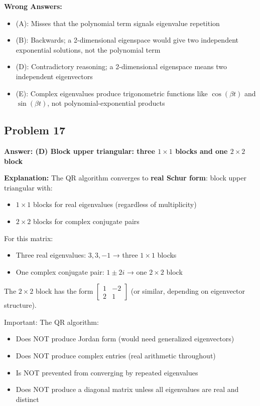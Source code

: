 \documentclass[12pt]{amsart}
\newcommand{\correct}[1]{{\color{correctgreen}\textbf{#1}}}
\begin{document}
\textbf{Wrong Answers:}
\begin{itemize}
\item (A): Misses that the polynomial term signals eigenvalue repetition
\item (B): Backwards; a 2-dimensional eigenspace would give two independent exponential solutions, not the polynomial term
\item (D): Contradictory reasoning; a 2-dimensional eigenspace means two independent eigenvectors
\item (E): Complex eigenvalues produce trigonometric functions like $\cos(\beta t)$ and $\sin(\beta t)$, not polynomial-exponential products
\end{itemize}

\subsection*{Problem 17}
\correct{Answer: (D) Block upper triangular: three $1 \times 1$ blocks and one $2 \times 2$ block}

\textbf{Explanation:} The QR algorithm converges to \textbf{real Schur form}: block upper triangular with:
\begin{itemize}
\item $1 \times 1$ blocks for real eigenvalues (regardless of multiplicity)
\item $2 \times 2$ blocks for complex conjugate pairs
\end{itemize}

For this matrix:
\begin{itemize}
\item Three real eigenvalues: $3, 3, -1$ → three $1 \times 1$ blocks
\item One complex conjugate pair: $1 \pm 2i$ → one $2 \times 2$ block
\end{itemize}

The $2 \times 2$ block has the form $\begin{bmatrix} 1 & -2 \\ 2 & 1 \end{bmatrix}$ (or similar, depending on eigenvector structure).

Important: The QR algorithm:
\begin{itemize}
\item Does NOT produce Jordan form (would need generalized eigenvectors)
\item Does NOT produce complex entries (real arithmetic throughout)
\item Is NOT prevented from converging by repeated eigenvalues
\item Does NOT produce a diagonal matrix unless all eigenvalues are real and distinct
\end{itemize}
\end{document}
